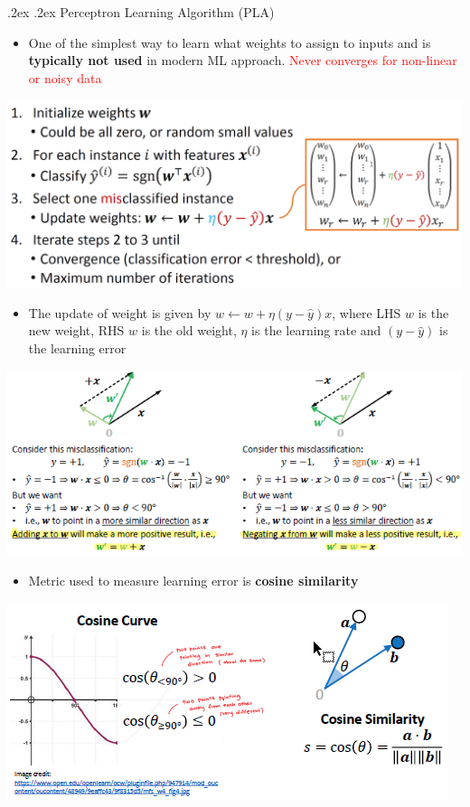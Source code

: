 \documentclass[landscape,a4paper]{article}
\makeatletter
\renewcommand{\subsection}{\@startsection{subsection}{1}{0mm}%
	{.2ex}%
	{.2ex}%
	{\sffamily\bfseries}}
\makeatother
\begin{document}
\begin{multicols*}{4}
	\subsection{Perceptron Learning Algorithm (PLA)}
	\begin{itemize}
		\item One of the simplest way to learn what weights to assign to inputs and is \textbf{typically not used} in modern ML approach. \textcolor{red}{Never converges for non-linear or noisy data}
	\end{itemize}
	\begin{center}
		\includegraphics[width=0.7\columnwidth]{pla}
	\end{center}
	\begin{itemize}
		\item The update of weight is given by $w\leftarrow w+\eta (y-\hat{y})x$, where LHS $w$ is the new weight, RHS $w$ is the old weight, $\eta$ is the learning rate and $(y-\hat{y})$ is the learning error
	\end{itemize}
	\begin{center}
		\includegraphics[width=0.7\columnwidth]{perceptron-weight-update}
	\end{center}
	\begin{itemize}
		\item Metric used to measure learning error is \textbf{cosine similarity}
	\end{itemize}
	\begin{center}
		\includegraphics[width=0.7\columnwidth]{consine-similarity}
	\end{center}

\end{multicols*}
\end{document}
